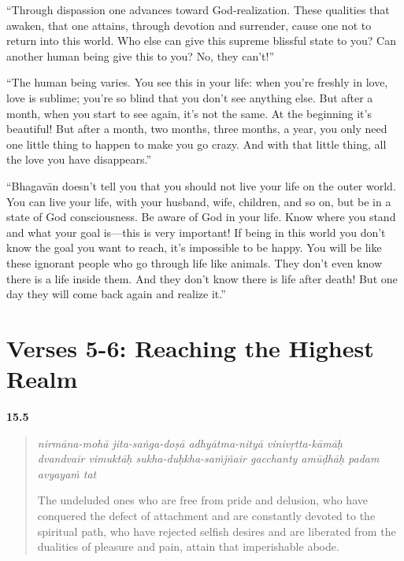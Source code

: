 \enquote{Through dispassion one advances toward God-realization. These qualities that awaken, that one attains, through devotion and surrender, cause one not to return into this world. Who else can give this supreme blissful state to you? Can another human being give this to you? No, they can’t!}

\enquote{The human being varies. You see this in your life: when you’re freshly in love, love is sublime; you’re so blind that you don’t see anything else. But after a month, when you start to see again, it’s not the same. At the beginning it’s beautiful! But after a month, two months, three months, a year, you only need one little thing to happen to make you go crazy. And with that little thing, all the love you have disappears.}

\enquote{Bhagavān doesn’t tell you that you should not live your life on the outer world. You can live your life, with your husband, wife, children, and so on, but be in a state of God consciousness. Be aware of God in your life. Know where you stand and what your goal is---this is very important! If being in this world you don’t know the goal you want to reach, it’s impossible to be happy. You will be like these ignorant people who go through life like animals. They don’t even know there is a life inside them. And they don’t know there is life after death! But one day they will come back again and realize it.}


\section{Verses 5-6: Reaching the Highest Realm}\label{sec-verses-5-6-reaching-the-highest-realm}


\par\noindent\textbf{15.5}\par
\begin{verse}
\textit{nirmāna-mohā jita-saṅga-doṣā adhyātma-nityā vinivṛtta-kāmāḥ} \\
\textit{dvandvair vimuktāḥ sukha-duḥkha-saṁjñair gacchanty amūḍhāḥ padam avyayaṁ tat}

\noindent The undeluded ones who are free from pride and delusion, who have conquered the defect of attachment and are constantly devoted to the spiritual path, who have rejected selfish desires and are liberated from the dualities of pleasure and pain, attain that imperishable abode.
\end{verse}
\par



